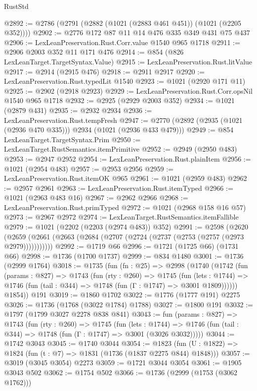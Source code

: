 \begin{lexlean}{RustStd}
\begin{coremodule}
@2892 := @2786 (@2791 (@2882 (@1021 (@2883 @461 @451)) (@1021 (@2205 @352))))
@2902 := @2776 @172 @87 @11 @14 @476 @335 @349 @431 @75 @437
@2906 := LexLeanPreservation.Rust.Corr.value @1540 @965 @1718
@2911 := @2906 @2003 @352 @11 @171 @476
@2914 := @854 (@826 LexLeanTarget.TargetSyntax.Value)
@2915 := LexLeanPreservation.Rust.litValue
@2917 := @2914 (@2915 @476)
@2918 := @2911 @2917
@2920 := LexLeanPreservation.Rust.typedLit @1540
@2923 := @1021 (@2920 @171 @11)
@2925 := @2902 (@2918 @2923)
@2929 := LexLeanPreservation.Rust.Corr.opsNil @1540 @965 @1718
@2932 := @2925 (@2929 @2003 @352)
@2934 := @1021 (@2879 @431)
@2935 := @2932 @2934
@2936 := LexLeanPreservation.Rust.tempFresh
@2947 := @2770 (@2892 (@2935 (@1021 (@2936 @470 @335))) @2934 (@1021 (@2936 @433 @479)))
@2949 := @854 LexLeanTarget.TargetSyntax.Prim
@2950 := LexLeanTarget.RustSemantics.itemPrimitive
@2952 := @2949 (@2950 @483)
@2953 := @2947 @2952
@2954 := LexLeanPreservation.Rust.plainItem
@2956 := @1021 (@2954 @483)
@2957 := @2953 @2956
@2959 := LexLeanPreservation.Rust.itemOK @965
@2961 := @1021 (@2959 @483)
@2962 := @2957 @2961
@2963 := LexLeanPreservation.Rust.itemTyped
@2966 := @1021 (@2963 @483 @16)
@2967 := @2962 @2966
@2968 := LexLeanPreservation.Rust.primTyped
@2972 := @1021 (@2968 @158 @16 @57)
@2973 := @2967 @2972
@2974 := LexLeanTarget.RustSemantics.itemFallible
@2979 := @1021 (@2202 (@2203 (@2974 @483)) @352)
@2991 := @2598
    (@2620 (@2659 (@2661 (@2663 (@2684 (@2707 (@2724 (@2737 (@2753 (@2757 (@2973 @2979)))))))))))
@2992 := @1719 @66
@2996 := @1721 (@1725 @66) (@1731 @66)
@2998 := @1736 (@1700 @1737)
@2999 := @834 @1480
@3001 := @1736 (@2999 @1764)
@3018 := @1735
    (fun (fn : @25) =>
    @2998
      (@1740
        (@1742
          (fun (params : @827) =>
          @1743
            (fun (rty : @260) =>
            @1745
              (fun (lets : @1744) =>
              @1746 (fun (tail : @344) => @1748 (fun (Γ : @1747) => @3001 @1809))))))
        @1854))
    @191
@3019 := @1860 @1702
@3022 := @1776 (@1777 @191) @2275
@3026 := @1736 (@1768 (@3022 @1784) @1788)
@3027 := @1800 @191
@3032 := @1797 (@1799 @3027 @2278 @838 @841)
@3043 := fun (params : @827) =>
  @1743
    (fun (rty : @260) =>
    @1745
      (fun (lets : @1744) =>
      @1746 (fun (tail : @344) => @1748 (fun (Γ : @1747) => @3001 (@3026 @3032)))))
@3044 := @1742 @3043
@3045 := @1740 @3044
@3054 := @1823 (fun (U : @1822) => @1824 (fun (t : @7) => @1831 (@1736 (@1837 @2275 @844) @1848)))
@3057 := @3019 (@3045 @3054) @2273
@3059 := @1721 @3044 @3054
@3061 := @1905 @3043 @502
@3062 := @1754 @502
@3066 := @1736 (@2999 (@1753 (@3062 @1762)))

\end{coremodule}
\end{lexlean}
